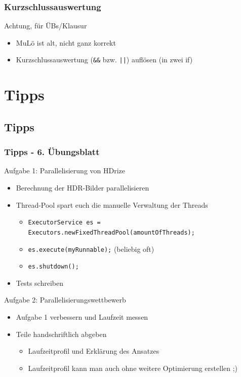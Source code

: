 \documentclass[18pt]{beamer}
\begin{document}
	\begin{frame}
		\frametitle{Kurzschlussauswertung}
		\begin{alertblock}{Achtung, für ÜBs/Klausur}
			\begin{itemize}
				\item MuLö ist alt, nicht ganz korrekt
				\item Kurzschlussauswertung (\texttt{\&\&} bzw. \texttt{||}) auflösen (in zwei if)
			\end{itemize}
		\end{alertblock}
	\end{frame}


\section{Tipps}
	\subsection{Tipps}
	\begin{frame}
		\frametitle{Tipps - 6. Übungsblatt}

		\begin{exampleblock}{Aufgabe 1: Parallelisierung von HDrize} 
			\begin{itemize}
				\item Berechnung der HDR-Bilder parallelisieren \pause
				\item Thread-Pool spart euch die manuelle Verwaltung der Threads
				\begin{itemize}
					\item \texttt{ExecutorService es = Executors.newFixedThreadPool(amountOfThreads);}
					\item \texttt{es.execute(myRunnable);} (beliebig oft)
					\item \texttt{es.shutdown();}
				\end{itemize} \pause
				\item Tests schreiben
			\end{itemize}
		\end{exampleblock}
		\pause
		\begin{exampleblock}{Aufgabe 2: Parallelisierungswettbewerb}
			\begin{itemize}
				\item Aufgabe 1 verbessern und Laufzeit messen
				\item Teile handschriftlich abgeben
				\begin{itemize}
					\item Laufzeitprofil und Erklärung des Ansatzes
					\item Laufzeitprofil kann man auch ohne weitere Optimierung erstellen ;)
				\end{itemize}
			\end{itemize}
		\end{exampleblock}
	\end{frame}
\end{document}
